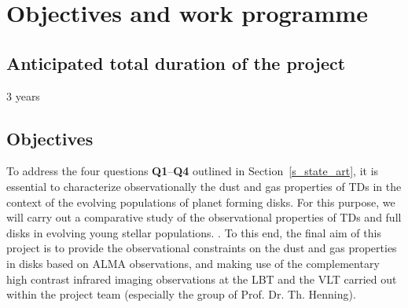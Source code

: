 \documentclass[10pt,fleqn,twoside]{article}
\begin{document}
\section{Objectives and work programme}
\renewcommand{\leftmark}{\sc Objectives and work programme}


\subsection{Anticipated total duration of the project}

3 years

\subsection{Objectives}
\label{s_obj}

To address the four questions {\bf Q1}--{\bf Q4} outlined in Section~\ref{s_state_art}, it is 
essential to characterize observationally the dust and gas properties of TDs in the context
of the evolving populations of planet forming disks. For this purpose, we will carry out a comparative
study of the observational properties of TDs and full disks in evolving young stellar 
populations. .  
To this end, the final aim of this project is to provide the observational constraints 
on the dust and gas properties in disks based on ALMA observations, and making use
of the complementary high contrast infrared imaging observations at the LBT and the 
VLT carried out within the project team (especially the group of Prof. Dr. Th. Henning). 
\end{document}
